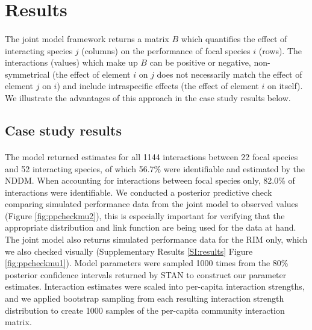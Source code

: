 \documentclass[a4,12pt]{article}
\begin{document}
\section{Results}
    
    \paragraph{}
    The joint model framework returns a matrix $B$ which quantifies the effect of interacting species $j$ (columns) on the performance of focal species $i$ (rows). The interactions (values) which make up $B$ can be positive or negative, non-symmetrical (the effect of element $i$ on $j$ does not necessarily match the effect of element $j$ on $i$) and include intraspecific effects (the effect of element $i$ on itself). We illustrate the advantages of this approach in the case study results below. 


    \subsection{Case study results}

    \paragraph{}
    The model returned estimates for all 1144 interactions between 22 focal species and 52 interacting species, of which 56.7\% were identifiable and estimated by the NDDM.  When accounting for interactions between focal species only, 82.0\% of interactions were identifiable. We conducted a posterior predictive check comparing simulated performance data from the joint model to observed values (Figure \ref{fig:ppcheckmu2}), this is especially important for verifying that the appropriate distribution and link function are being used for the data at hand. The joint model also returns simulated performance data for the RIM only, which we also checked visually (Supplementary Results \ref{SI:results} Figure \ref{fig:ppcheckmu1}). Model parameters were sampled 1000 times from the 80\% posterior confidence intervals returned by STAN to construct our parameter estimates. Interaction estimates were scaled into per-capita interaction strengths, and we applied bootstrap sampling from each resulting interaction strength distribution to create 1000 samples of the per-capita community interaction matrix.
\end{document}
